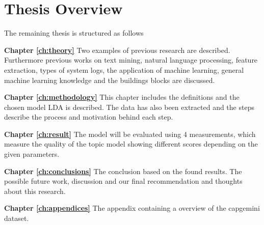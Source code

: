 \section{Thesis Overview} \label{introduction:thesisoverview}
The remaining thesis is structured as follows\:

\setlength{\parindent}{3ex} \textbf{Chapter \ref{ch:theory}}\: Two examples of previous research are described. Furthermore previous works on text mining, natural language processing, feature extraction, types of system logs, the application of machine learning, general machine learning knowledge and the buildings blocks are discussed.

\textbf{Chapter \ref{ch:methodology}}\: This chapter includes the definitions and the chosen model LDA is described. The data has also been extracted and the steps describe the process and motivation behind each step. 

\textbf{Chapter \ref{ch:result}}\: The model will be evaluated using 4 measurements, which measure the quality of the topic model showing different scores depending on the given parameters.

\textbf{Chapter \ref{ch:conclusions}}\: The conclusion based on the found results. The possible future work, discussion and our final recommendation and thoughts about this research.

\textbf{Chapter \ref{ch:appendices}}\: The appendix containing a overview of the capgemini dataset.


\begin{comment}
It is recommended to end the introduction with an overview of the thesis. This chapter contains the introduction; Chapter~\ref{ch:definitions} includes the definitions; Chapter~\ref{ch:relatedwork} discusses related work; Chapter~\ref{ch:evaluation} evaluates the contributions; Chapter~\ref{ch:conclusions} concludes.

Also make a nice sentence with ``bachelor thesis'', LIACS and the names of the supervisors.

\end{comment}
